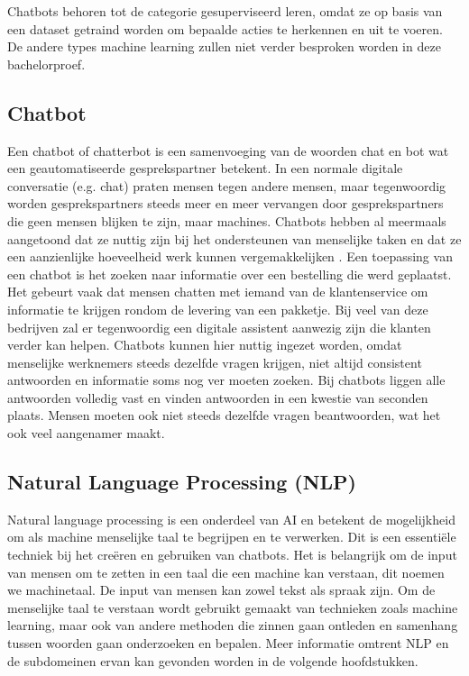 Chatbots behoren tot de categorie gesuperviseerd leren, omdat ze op basis van een dataset getraind worden om bepaalde acties te herkennen en uit te voeren. De andere types machine learning zullen niet verder besproken worden in deze bachelorproef.

\subsection{Chatbot}
\label{subsec:begrippen-chatbot}

Een chatbot of chatterbot is een samenvoeging van de woorden chat en bot wat een geautomatiseerde gesprekspartner betekent. In een normale digitale conversatie (e.g. chat) praten mensen tegen andere mensen, maar tegenwoordig worden gesprekspartners steeds meer en meer vervangen door gesprekspartners die geen mensen blijken te zijn, maar machines. Chatbots hebben al meermaals aangetoond dat ze nuttig zijn bij het ondersteunen van menselijke taken en dat ze een aanzienlijke hoeveelheid werk kunnen vergemakkelijken \autocite{Atwell2007}. Een toepassing van een chatbot is het zoeken naar informatie over een bestelling die werd geplaatst. Het gebeurt vaak dat mensen chatten met iemand van de klantenservice om informatie te krijgen rondom de levering van een pakketje. Bij veel van deze bedrijven zal er tegenwoordig een digitale assistent aanwezig zijn die klanten verder kan helpen. Chatbots kunnen hier nuttig ingezet worden, omdat menselijke werknemers steeds dezelfde vragen krijgen, niet altijd consistent antwoorden en informatie soms nog ver moeten zoeken. Bij chatbots liggen alle antwoorden volledig vast en vinden antwoorden in een kwestie van seconden plaats. Mensen moeten ook niet steeds dezelfde vragen beantwoorden, wat het ook veel aangenamer maakt.

\subsection{Natural Language Processing (NLP)}
\label{subsec:begrippen-nlp}


Natural language processing is een onderdeel van AI en betekent de mogelijkheid om als machine menselijke taal te begrijpen en te verwerken. Dit is een essentiële techniek bij het creëren en gebruiken van chatbots. Het is belangrijk om de input van mensen om te zetten in een taal die een machine kan verstaan, dit noemen we machinetaal. De input van mensen kan zowel tekst als spraak zijn. Om de menselijke taal te verstaan wordt gebruikt gemaakt van technieken zoals machine learning, maar ook van andere methoden die zinnen gaan ontleden en samenhang tussen woorden gaan onderzoeken en bepalen. Meer informatie omtrent NLP en de subdomeinen ervan kan gevonden worden in de volgende hoofdstukken.


